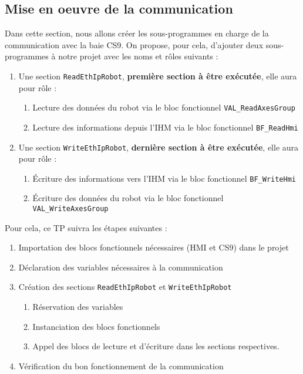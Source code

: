 
\subsection{Mise en oeuvre de la communication}
Dans cette section, nous allons créer les sous-programmes en charge de la communication avec la baie CS9. 
On propose, pour cela, d'ajouter deux sous-programmes à notre projet avec les noms et rôles suivants : 
\begin{enumerate}
    \item Une section \texttt{ReadEthIpRobot}, \textbf{première section à être exécutée}, elle aura pour rôle :
    \begin{enumerate}
        \item Lecture des données du robot via le bloc fonctionnel \texttt{VAL\_ReadAxesGroup}
        \item Lecture des informations depuis l'IHM via le bloc fonctionnel \texttt{BF\_ReadHmi}
    \end{enumerate} 
    \item Une section \texttt{WriteEthIpRobot}, \textbf{dernière section à être exécutée}, elle aura pour rôle :
    \begin{enumerate}[resume]
        \item Écriture des informations vers l'IHM via le bloc fonctionnel \texttt{BF\_WriteHmi}
        \item Écriture des données du robot via le bloc fonctionnel \texttt{VAL\_WriteAxesGroup}
    \end{enumerate}
\end{enumerate}


Pour cela, ce TP suivra les étapes suivantes : 
\begin{enumerate}
    \item Importation des blocs fonctionnels nécessaires (HMI et CS9) dans le projet
    \item Déclaration des variables nécessaires à la communication
    \item Création des sections \texttt{ReadEthIpRobot} et \texttt{WriteEthIpRobot}
    \begin{enumerate}
        \item Réservation des variables 
        \item Instanciation des blocs fonctionnels
        \item Appel des blocs de lecture et d'écriture dans les sections respectives. 
    \end{enumerate}
    \item Vérification du bon fonctionnement de la communication
\end{enumerate}

